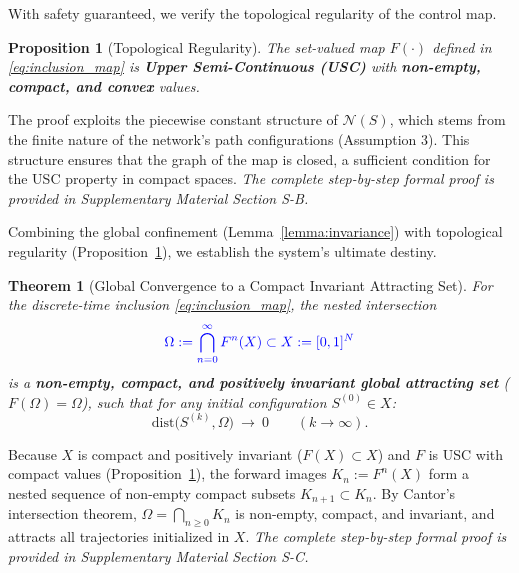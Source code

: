 \documentclass[journal]{IEEEtran}
\theoremstyle{plain}
\newtheorem{theorem}{Theorem}
\newtheorem{proposition}{Proposition}
\theoremstyle{definition}
\newcommand{\rev}[1]{{\color{blue}#1}}
\begin{document}
With safety guaranteed, we verify the topological regularity of the control map.

\begin{proposition}[Topological Regularity]
\label{prop:usc}
The set-valued map $F(\cdot)$ defined in \eqref{eq:inclusion_map} is \textbf{Upper Semi-Continuous (USC)} with \textbf{non-empty, compact, and convex} values.
\end{proposition}
\begin{IEEEproof}
The proof exploits the piecewise constant structure of $\mathcal{N}(S)$, which stems from the finite nature of the network's path configurations (Assumption 3). This structure ensures that the graph of the map is closed, a sufficient condition for the USC property in compact spaces. \textit{The complete step-by-step formal proof is provided in Supplementary Material Section S-B.}
\end{IEEEproof}

Combining the global confinement (Lemma~\ref{lemma:invariance}) with topological regularity (Proposition~\ref{prop:usc}), we establish the system's ultimate destiny.

\begin{theorem}[\rev{Global Convergence to a Compact Invariant Attracting Set}]
\label{thm:attractor}
For the discrete-time inclusion \eqref{eq:inclusion_map}, the nested intersection
\begin{equation}\label{eq:omega_nested_def}
\rev{\Omega := \bigcap_{n=0}^{\infty} F^n(X) \subset X:=[0,1]^N}
\end{equation}
is a \textbf{non-empty, compact, and positively invariant global attracting set} ($F(\Omega)=\Omega$), such that for any initial configuration $S^{(0)}\in X$:
\begin{equation}\label{eq:attractor_convergence}
\mathrm{dist}\big(S^{(k)},\Omega\big)\ \to\ 0\qquad (k\to\infty).
\end{equation}
\end{theorem}
\begin{IEEEproof}
Because $X$ is compact and positively invariant ($F(X) \subset X$) and $F$ is USC with compact values (Proposition~\ref{prop:usc}), the forward images $K_n := F^n(X)$ form a nested sequence of non-empty compact subsets $K_{n+1} \subset K_n$. By Cantor's intersection theorem, $\Omega = \bigcap_{n\ge 0} K_n$ is non-empty, compact, and invariant, and attracts all trajectories initialized in $X$. \textit{The complete step-by-step formal proof is provided in Supplementary Material Section S-C.}
\end{IEEEproof}
\end{document}
